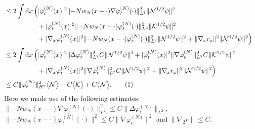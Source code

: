 \documentclass[11pt,a4paper,draft,DIV11]{scrartcl}	%
\newcommand{\di}{\textrm{d}}		%
\newcommand{\Ncal}{\mathcal{N}}		%
\newcommand{\Kcal}{\mathcal{K}}		%
\newcommand{\norm}[1]{\lVert#1\rVert}	%
\newcommand{\ev}[1]{\big<#1\big>}	%
\newcommand{\ph}{\varphi_t^{(N)}}	%
\newcommand{\gradone}{\nabla_2}
\newcommand{\tagg}[1]{ \stepcounter{equation} \tag{\theequation} \label{eq:#1} } %
\begin{document}
\begin{fleqn}[0.5em]
\begin{align*}
& \leq 2\int \di x\, \Big( \lvert \ph(x)\rvert^2 \norm{-N w_N(x-\cdot)\nabla\ph(\cdot)}_{L^2}^2 \norm{\Ncal^{1/2}\psi}^2  \\
& \qquad\qquad\quad + \lvert \ph(x)\rvert^2 \norm{-Nw_N(x-\cdot) \ph(\cdot)}_{L^2}^2 \norm{\Kcal^{1/2}\psi}^2  \\
& \qquad\qquad\quad + \lvert \nabla_x \ph(x)\rvert^2 \norm{-N w_N(x-\cdot) \ph(\cdot)}_{L^2}^2 \norm{\Ncal^{1/2}\psi}^2 + \norm{\nabla_x r_x}^2 \norm{\Ncal^{1/2}\psi}^2 \Big) \\
& \leq 2 \int \di x\, \Big( \lvert \ph(x)\rvert^2 \norm{\Delta \ph}_{L^2}^2 C \norm{\Ncal^{1/2}\psi}^2 + \lvert \ph(x)\rvert^2 \norm{\nabla \ph}_{L^2}^2 C \norm{\Kcal^{1/2}\psi}^2 \\
& \qquad\qquad\quad + \lvert \nabla_x \ph(x)\rvert^2 \norm{\nabla \ph}_{L^2}^2 C \norm{\Ncal^{1/2}\psi}^2 + \norm{\nabla_x r_x}^2 \norm{\Ncal^{1/2}\psi}^2 \Big)\\
& \leq C \norm{\ph}_{H^2}^2 \ev{\Ncal} + C\ev{\Kcal} + C\ev{\Ncal}. \tagg{bound2B}
\end{align*}
Here we made use of the following estimates: $\norm{-N w_N(x-\cdot) \nabla\ph(\cdot)}_{L^2}^2 \leq C\norm{\Delta \ph}_{L^2}$, $\norm{-N w_N(x-\cdot)\ph(\cdot)}^2 \leq C \norm{\nabla \ph}^2$  and $ \norm{\gradone r} \leq C$.\newline


\end{fleqn}
\end{document}
